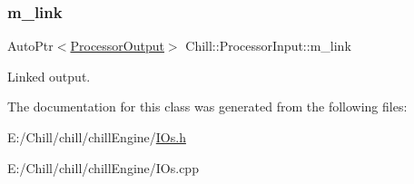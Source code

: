 \subsubsection{\texorpdfstring{m\+\_\+link}{m\_link}}
{\footnotesize\ttfamily Auto\+Ptr$<$\mbox{\hyperlink{class_chill_1_1_processor_output}{Processor\+Output}}$>$ Chill\+::\+Processor\+Input\+::m\+\_\+link}

Linked output. 

The documentation for this class was generated from the following files\+:\begin{DoxyCompactItemize}
\item 
E\+:/\+Chill/chill/chill\+Engine/\mbox{\hyperlink{_i_os_8h}{I\+Os.\+h}}\item 
E\+:/\+Chill/chill/chill\+Engine/I\+Os.\+cpp\end{DoxyCompactItemize}
